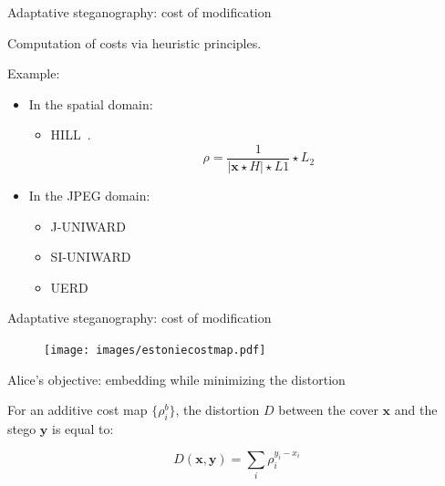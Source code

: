 \documentclass[10pt]{beamer}
\renewcommand{\vec}[1]{\mathbf{#1}}
\begin{document}
\begin{frame}{Adaptative steganography: cost of modification}




Computation of costs via \alert{heuristic principles}. 

Example:
\begin{itemize}
    \item In the spatial domain:
        \begin{itemize}
            \item HILL~\cite{hill}. 
                \begin{equation}
                    \rho=\frac{1}{|\mathbf{x} \star H| \star L 1} \star L_{2}
                \end{equation}
        \end{itemize}
    \item In the JPEG domain:
        \begin{itemize}
            \item J-UNIWARD~\cite{juni}
            \item SI-UNIWARD~\cite{juni}
            \item UERD~\cite{uerd}
        \end{itemize}
    
\end{itemize}

\end{frame}




\begin{frame}{Adaptative steganography: cost of modification}
\begin{figure}[h]
\texttt{[image: images/estoniecostmap.pdf]}
\end{figure}
\end{frame}

\begin{frame}{Alice's objective: embedding while minimizing the distortion}

\begin{tcolorbox}[colback=lightgreen,colframe=greentheme,title=\textbf{Definition} (Distortion)]
For an additive cost map $\{\rho_i^b\}$, the  distortion $D$ between the cover $\vec{x}$ and the stego $\vec{y}$ is equal to:

\begin{equation}
D(\mathbf{x},\mathbf{y}) = \sum_i \rho_i^{y_i - x_i}
\end{equation}

\end{tcolorbox}
\end{frame}
\end{document}

